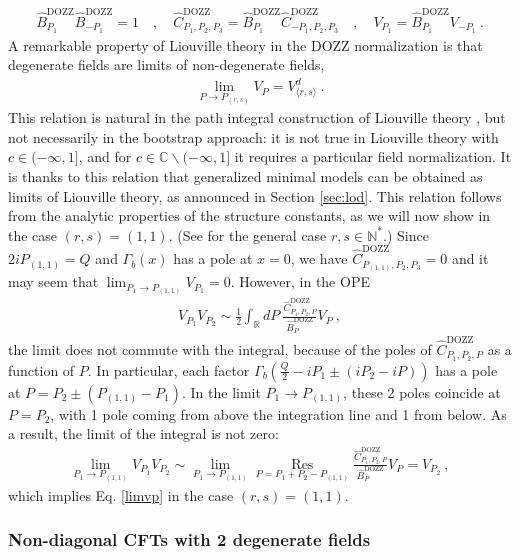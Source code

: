 \documentclass[12pt, a4paper]{article}
\begin{document}
\begin{align}
 \hat B^\text{DOZZ}_{P_1}\hat B^\text{DOZZ}_{-P_1}=1 \quad , \quad  \hat C^\text{DOZZ}_{P_1,P_2,P_3} = \hat B^\text{DOZZ}_{P_1}\hat C^\text{DOZZ}_{-P_1,P_2,P_3} \quad , \quad V_{P_1} = \hat B^\text{DOZZ}_{P_1} V_{-P_1}\ . 
\end{align}
A remarkable property of Liouville theory in the DOZZ normalization is that degenerate fields are limits of non-degenerate fields,
\begin{align}
 \lim_{P\to P_{(r,s)}} V_P = V^d_{\langle r,s\rangle} \ .
 \label{limvp}
\end{align}
This relation is natural in the path integral construction of Liouville theory \cite{zz95}, but not necessarily in the bootstrap approach: it is not true in Liouville theory with $c\in (-\infty, 1]$, and for $c\in\mathbb{C}\backslash (-\infty,1]$ it requires a particular field normalization. It is thanks to this relation that generalized minimal models can be obtained as limits of Liouville theory, as announced in Section \ref{sec:lod}. This relation follows from the analytic properties of the structure constants, as we will now show in the case $(r,s)=(1,1)$. (See \cite[Section 3.1.5]{rib14} for the general case $r,s\in\mathbb{N}^*$.) Since $2iP_{(1,1)}=Q$ and $\Gamma_b(x)$ has a pole at $x=0$, we have $\hat C^\text{DOZZ}_{P_{(1,1)},P_2,P_3} = 0$ and it may seem that $\lim_{P_1\to P_{(1,1)}} V_{P_1} = 0$. However, in the OPE
\begin{align}
V_{P_1}V_{P_2} \sim \frac12 \int_{\mathbb{R}}dP\ \frac{\hat C^\text{DOZZ}_{P_1,P_2,P}}{\hat B^\text{DOZZ}_{P}}V_P\ , 
\end{align}
the limit does not commute with the integral,
because of the poles of $\hat C^\text{DOZZ}_{P_1,P_2,P}$ as a function of $P$. In particular, each factor $\Gamma_b(\frac{Q}{2}-iP_1\pm (iP_2-iP))$ has a pole at $P= P_2\pm (P_{(1,1)}-P_1)$. In the limit $P_1\to P_{(1,1)}$, these 2 poles coincide at $P=P_2$, with 1 pole coming from above the integration line and 1 from below. As a result, the limit of the integral is not zero:
\begin{align}
 \lim_{P_1\to P_{(1,1)}}V_{P_1}V_{P_2} \sim \lim_{P_1\to P_{(1,1)}}  \underset{P=P_1+P_2-P_{(1,1)}}{\operatorname{Res}}\frac{\hat C^\text{DOZZ}_{P_1,P_2,P}}{\hat B^\text{DOZZ}_{P}}V_P=V_{P_2}\ ,
\end{align}
which implies Eq. \eqref{limvp} in the case $(r,s)=(1,1)$. 

\subsubsection{Non-diagonal CFTs with 2 degenerate fields}
\end{document}
